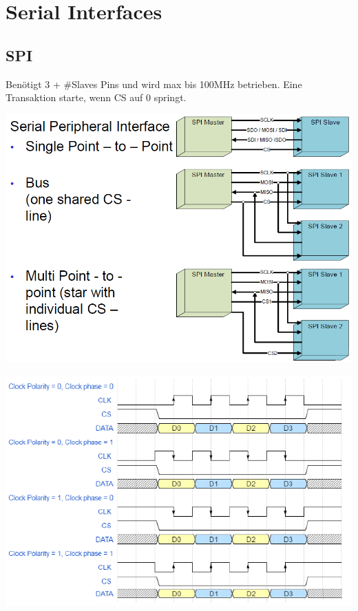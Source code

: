 \section{Serial Interfaces}
\subsection{SPI}
Benötigt 3 + \#Slaves Pins und wird max bis 100MHz betrieben. Eine Transaktion starte, wenn CS auf 0 springt.
\begin{center}
	\includegraphics[width=\columnwidth]{Images/spi}
\end{center}
\begin{center}
	\includegraphics[width=\columnwidth]{Images/spi_mode}
\end{center}

